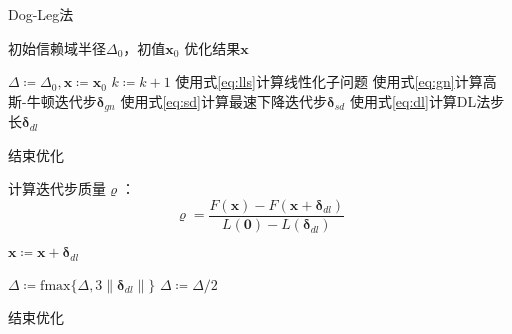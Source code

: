 \begin{algorithm}[htb!]
\caption{Dog-Leg法}
\begin{algorithmic}
    \Require 初始信赖域半径$\Delta_0$，初值$\bm{x}_0$
    \Ensure 优化结果$\bm{x}$

    \State $\Delta \coloneqq \Delta_0, \bm{x} \coloneqq \bm{x}_0$
        \State $k \coloneqq k+1$
        \State 使用式\eqref{eq:lls}计算线性化子问题
        \State 使用式\eqref{eq:gn}计算高斯-牛顿迭代步$\bm{\delta}_{gn}$
        \State 使用式\eqref{eq:sd}计算最速下降迭代步$\bm{\delta}_{sd}$
        \State 使用式\eqref{eq:dl}计算DL法步长$\bm{\delta}_{dl}$

            \State 结束优化
        \EndIf

        \State 计算迭代步质量$\varrho$：
        \[
            \varrho = \frac {F(\bm{x})-F(\bm{x}+\bm{\delta}_{dl})}
                            {L(\bm{0})-L(\bm{\delta}_{dl})}
        \]

            \State $\bm{x} \coloneqq \bm{x} + \bm{\delta}_{dl}$
        \EndIf

            \State $\Delta \coloneqq \text{fmax}\{\Delta,3\left\|\bm{\delta}_{dl}\right\|\}$
            \State $\Delta \coloneqq \Delta/2$
        \EndIf

            \State 结束优化
        \EndIf
    \EndFor
\end{algorithmic}
\label{alg:dogleg}
\end{algorithm}
